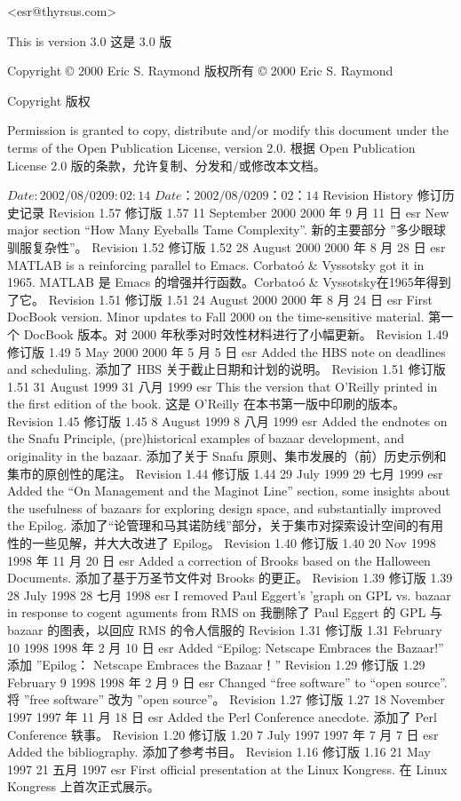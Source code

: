 \documentclass[a4paper,12pt,UTF8,twoside]{ctexbook}
\begin{document}
<esr@thyrsus.com>

This is version 3.0  这是 3.0 版

Copyright © 2000 Eric S. Raymond
版权所有 © 2000 Eric S. Raymond

Copyright  版权

Permission is granted to copy, distribute and/or modify this document under the terms of the Open Publication License, version 2.0.
根据 Open Publication License 2.0 版的条款，允许复制、分发和/或修改本文档。

$Date: 2002/08/02 09:02:14 $
$Date：2002/08/02 09：02：14 $
Revision History  修订历史记录
Revision 1.57  修订版 1.57	11 September 2000  2000 年 9 月 11 日	esr
New major section ``How Many Eyeballs Tame Complexity''.
新的主要部分 ''多少眼球驯服复杂性''。
Revision 1.52  修订版 1.52	28 August 2000  2000 年 8 月 28 日	esr
MATLAB is a reinforcing parallel to Emacs. Corbatoó & Vyssotsky got it in 1965.
MATLAB 是 Emacs 的增强并行函数。Corbatoó & Vyssotsky在1965年得到了它。
Revision 1.51  修订版 1.51	24 August 2000  2000 年 8 月 24 日	esr
First DocBook version. Minor updates to Fall 2000 on the time-sensitive material.
第一个 DocBook 版本。对 2000 年秋季对时效性材料进行了小幅更新。
Revision 1.49  修订版 1.49	5 May 2000  2000 年 5 月 5 日	esr
Added the HBS note on deadlines and scheduling.
添加了 HBS 关于截止日期和计划的说明。
Revision 1.51  修订版 1.51	31 August 1999  31 八月 1999	esr
This the version that O'Reilly printed in the first edition of the book.
这是 O'Reilly 在本书第一版中印刷的版本。
Revision 1.45  修订版 1.45	8 August 1999  8 八月 1999	esr
Added the endnotes on the Snafu Principle, (pre)historical examples of bazaar development, and originality in the bazaar.
添加了关于 Snafu 原则、集市发展的（前）历史示例和集市的原创性的尾注。
Revision 1.44  修订版 1.44	29 July 1999  29 七月 1999	esr
Added the ``On Management and the Maginot Line'' section, some insights about the usefulness of bazaars for exploring design space, and substantially improved the Epilog.
添加了“论管理和马其诺防线”部分，关于集市对探索设计空间的有用性的一些见解，并大大改进了 Epilog。
Revision 1.40  修订版 1.40	20 Nov 1998  1998 年 11 月 20 日	esr
Added a correction of Brooks based on the Halloween Documents.
添加了基于万圣节文件对 Brooks 的更正。
Revision 1.39  修订版 1.39	28 July 1998  28 七月 1998	esr
I removed Paul Eggert's 'graph on GPL vs. bazaar in response to cogent aguments from RMS on
我删除了 Paul Eggert 的 GPL 与 bazaar 的图表，以回应 RMS 的令人信服的
Revision 1.31  修订版 1.31	February 10 1998   1998 年 2 月 10 日	esr
Added ``Epilog: Netscape Embraces the Bazaar!''
添加 ''Epilog： Netscape Embraces the Bazaar！''
Revision 1.29  修订版 1.29	February 9 1998  1998 年 2 月 9 日	esr
Changed ``free software'' to ``open source''.
将 ''free software'' 改为 ''open source''。
Revision 1.27  修订版 1.27	18 November 1997  1997 年 11 月 18 日	esr
Added the Perl Conference anecdote.
添加了 Perl Conference 轶事。
Revision 1.20  修订版 1.20	7 July 1997  1997 年 7 月 7 日	esr
Added the bibliography.   添加了参考书目。
Revision 1.16  修订版 1.16	21 May 1997  21 五月 1997	esr
First official presentation at the Linux Kongress.
在 Linux Kongress 上首次正式展示。
\end{document}
